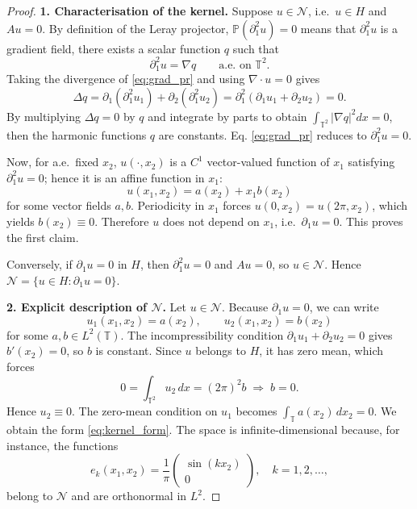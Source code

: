 \documentclass[11pt,a4paper,reqno]{amsart}
\theoremstyle{definition}
\newcommand{\N}{\mathcal{N}}
\begin{document}
\begin{proof}
  \textbf{1.  Characterisation of the kernel.}\;
  Suppose $u\in\N$, i.e.\ $u\in H$ and $A u = 0$.
  By definition of the Leray projector, $\mathbb{P}(\partial_1^2 u) = 0$ means that $\partial_1^2 u$ is a gradient field,
  there exists a scalar function $q$ such that
  \begin{equation}\label{eq:grad_pr}
    \partial_1^2 u = \nabla q \qquad\text{a.e.\ on }\mathbb{T}^2.
  \end{equation}
  Taking the divergence of \eqref{eq:grad_pr} and using $\nabla\cdot u = 0$ gives
  \[
    \Delta q = \partial_1(\partial_1^2 u_1) + \partial_2(\partial_1^2 u_2)
    = \partial_1^2(\partial_1 u_1 + \partial_2 u_2) = 0 .
  \]
   By multiplying $\Delta q=0$ by $q$ and integrate by parts
  to obtain $\int_{\mathbb{T}^2} |\nabla q|^2 dx = 0$,  then the harmonic functions $q$ are constants.
 Eq. \eqref{eq:grad_pr} reduces to $\partial_1^2 u = 0$.

  Now, for a.e.\ fixed $x_2$, $u(\cdot,x_2)$ is a $C^1$ vector-valued function of $x_1$ satisfying
  $\partial_1^2 u = 0$; hence it is an affine function in $x_1$:
  \[
    u(x_1,x_2) = a(x_2) + x_1 b(x_2)
  \]
  for some vector fields $a,b$.  Periodicity in $x_1$ forces $u(0,x_2)=u(2\pi,x_2)$, which yields
  $b(x_2) \equiv 0$.  Therefore $u$ does not depend on $x_1$, i.e.\ $\partial_1 u = 0$.
  This proves the first claim.

  Conversely, if $\partial_1 u = 0$ in $H$, then $\partial_1^2 u = 0$ and $A u = 0$, so $u\in\N$.
  Hence $\N = \{ u\in H : \partial_1 u = 0\}$.

  \textbf{2.  Explicit description of $\N$.}\;
  Let $u\in\N$.  Because $\partial_1 u = 0$, we can write
  \[
    u_1(x_1,x_2) = a(x_2),\qquad u_2(x_1,x_2) = b(x_2)
  \]
  for some $a,b\in L^2(\mathbb{T})$.  The incompressibility condition
  $\partial_1 u_1 + \partial_2 u_2 = 0$ gives $b'(x_2) = 0$, so $b$ is constant.
  Since $u$ belongs to $H$, it has zero mean, which forces
  \[
    0 = \int_{\mathbb{T}^2} u_2 \,dx = (2\pi)^2 b \;\Longrightarrow\; b = 0 .
  \]
  Hence $u_2 \equiv 0$.  The zero-mean condition on $u_1$ becomes $\int_{\mathbb{T}} a(x_2)\,dx_2 = 0$.
  We obtain the form \eqref{eq:kernel_form}.
  The space is infinite-dimensional because, for instance, the functions
  \[
    e_k(x_1,x_2) = \frac{1}{\pi}\begin{pmatrix} \sin(k x_2) \\ 0 \end{pmatrix},\quad k=1,2,\dots,
  \]
  belong to $\N$ and are orthonormal in $L^2$.


\end{proof}
\end{document}
